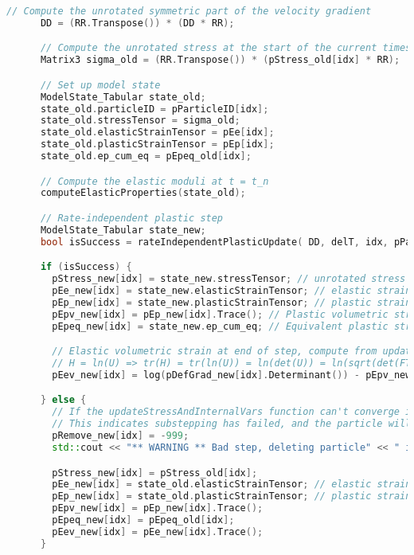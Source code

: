 \begin{enumerate}
\begin{lstlisting}[language=Cpp]
      // Compute the unrotated symmetric part of the velocity gradient
      DD = (RR.Transpose()) * (DD * RR);

      // Compute the unrotated stress at the start of the current timestep
      Matrix3 sigma_old = (RR.Transpose()) * (pStress_old[idx] * RR);

      // Set up model state
      ModelState_Tabular state_old;
      state_old.particleID = pParticleID[idx];
      state_old.stressTensor = sigma_old;
      state_old.elasticStrainTensor = pEe[idx];
      state_old.plasticStrainTensor = pEp[idx];
      state_old.ep_cum_eq = pEpeq_old[idx];

      // Compute the elastic moduli at t = t_n
      computeElasticProperties(state_old);

      // Rate-independent plastic step
      ModelState_Tabular state_new;
      bool isSuccess = rateIndependentPlasticUpdate( DD, delT, idx, pParticleID[idx], state_old, state_new);

      if (isSuccess) {
        pStress_new[idx] = state_new.stressTensor; // unrotated stress at end of step
        pEe_new[idx] = state_new.elasticStrainTensor; // elastic strain at end of step
        pEp_new[idx] = state_new.plasticStrainTensor; // plastic strain at end of step
        pEpv_new[idx] = pEp_new[idx].Trace(); // Plastic volumetric strain at end of step
        pEpeq_new[idx] = state_new.ep_cum_eq; // Equivalent plastic strain at end of step

        // Elastic volumetric strain at end of step, compute from updated  deformation gradient.
        // H = ln(U) => tr(H) = tr(ln(U)) = ln(det(U)) = ln(sqrt(det(FT) det(F))) = ln J
        pEev_new[idx] = log(pDefGrad_new[idx].Determinant()) - pEpv_new[idx];

      } else {
        // If the updateStressAndInternalVars function can't converge it will  return false.
        // This indicates substepping has failed, and the particle will be  deleted.
        pRemove_new[idx] = -999;
        std::cout << "** WARNING ** Bad step, deleting particle" << " idx = " << idx << " particleID = " << pParticleID[idx] << ":" << __FILE__ << ":" << __LINE__ << std::endl;

        pStress_new[idx] = pStress_old[idx];
        pEe_new[idx] = state_old.elasticStrainTensor; // elastic strain at start of step
        pEp_new[idx] = state_old.plasticStrainTensor; // plastic strain at start of step
        pEpv_new[idx] = pEp_new[idx].Trace();
        pEpeq_new[idx] = pEpeq_old[idx];
        pEev_new[idx] = pEe_new[idx].Trace();
      }


\end{lstlisting}
\end{enumerate}
